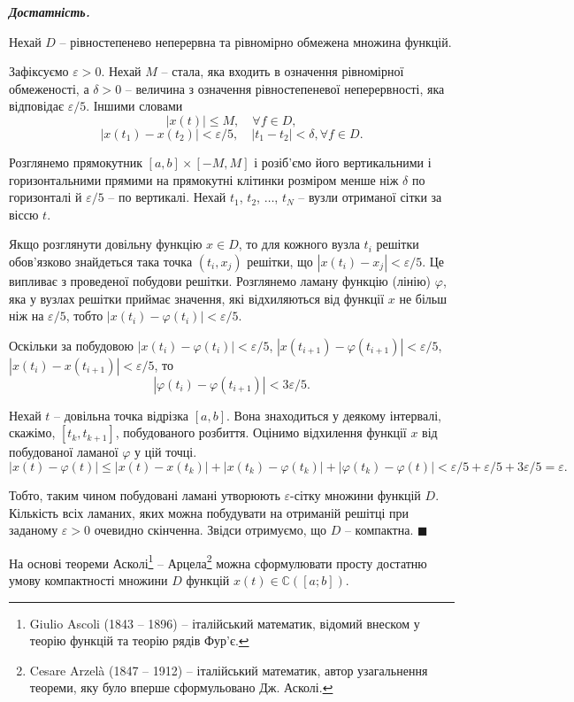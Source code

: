 \documentclass[14pt,twoside]{extreport}
\theoremstyle{mystyle}
\renewenvironment{proof}{{\bfseries Доведення.}}{$\blacksquare$}
\numberwithin{equation}{chapter}
\newcommand{\cab}{\mathbb{C}([a; b])}
\begin{document}
\begin{proof}
\emph{\textbf{Достатність.}}

Нехай $D$ -- рівностепенево неперервна та рівномірно обмежена множина функцій.

Зафіксуємо $\varepsilon>0$. Нехай $M$ -- стала, яка входить в означення рівномірної обмеженості, а $\delta>0$ -- величина з означення рівностепеневої неперервності, яка відповідає $\varepsilon/5$. Іншими словами
\[|x(t)|\leqslant M, \quad \forall f\in D,\]
\[|x(t_1)-x(t_2)|<\varepsilon/5, \quad |t_1-t_2|<\delta,\forall f\in D.\]

Розглянемо прямокутник $[a,b]\times[-M,M]$ і розіб'ємо його вертикальними і горизонтальними прямими на прямокутні клітинки розміром менше ніж $\delta$ по горизонталі й $\varepsilon/5$ -- по вертикалі. Нехай $t_1$, $t_2$, $\ldots$, $t_N$ -- вузли отриманої сітки за віссю $t$.

Якщо розглянути довільну функцію $x\in D$, то для кожного вузла $t_i$ решітки обов'язково знайдеться така точка $(t_i, x_j)$ решітки, що $|x(t_i)-x_j|<\varepsilon/5$. Це випливає з проведеної побудови решітки. Розглянемо ламану функцію (лінію) $\varphi$, яка у вузлах решітки приймає значення, які відхиляються від функції $x$ не більш ніж на $\varepsilon/5$, тобто
$|x(t_i)-\varphi(t_i)|<\varepsilon/5$.

Оскільки за побудовою $|x(t_i)-\varphi(t_i)|<\varepsilon/5$, $|x(t_{i+1}) - \varphi(t_{i+1})|<\varepsilon/5$, $|x(t_i)-x(t_{i+1})|<\varepsilon/5$, то
\[|\varphi(t_{i})-\varphi(t_{i+1})|<3\varepsilon/5.\]

Нехай $t$ -- довільна точка відрізка $[a,b]$. Вона знаходиться у деякому інтервалі, скажімо, $[t_k, t_{k+1}]$, побудованого розбиття. Оцінимо відхилення функції $x$ від побудованої ламаної $\varphi$ у цій точці.
\[|x(t)-\varphi(t)|\leqslant|x(t)-x(t_k)|+|x(t_k)-\varphi(t_k)|+|\varphi(t_k)-\varphi(t)| <\varepsilon/5+\varepsilon/5+3\varepsilon/5=\varepsilon.\]

Тобто, таким чином побудовані ламані утворюють $\varepsilon$-сітку множини функцій $D$. Кількість всіх ламаних, яких можна побудувати на отриманій решітці при заданому $\varepsilon>0$ очевидно скінченна. Звідси отримуємо, що $D$ -- компактна.
\end{proof}

На основі теореми Асколі\footnote{Giulio Ascoli (1843 --  1896) -- італійський математик, відомий внеском у теорію функцій та теорію рядів Фур'є.} -- Арцела\footnote{Cesare Arzel\`{a} (1847 -- 1912) -- італійський математик, автор узагальнення теореми, яку було вперше сформульовано Дж. Асколі.} можна сформулювати просту достатню умову компактності множини $D$ функцій $x(t) \in \cab$.
\end{document}

